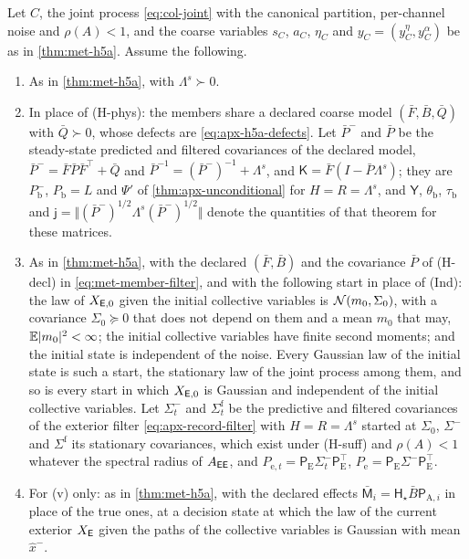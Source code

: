 \begin{theorem}\label{thm:apx-h5a}
Let $C$, the joint process \eqref{eq:col-joint} with the canonical partition, per-channel noise and $\rho(A)<1$, and the coarse variables $s_C$, $a_C$, $\eta_C$ and $y_C=(y^\eta_C,y^\alpha_C)$ be as in \cref{thm:met-h5a}. Assume the following.
\begin{enumerate}
\item[(H-suff)] As in \cref{thm:met-h5a}, with $\Lambda^s\succ0$.
\item[(H-decl)] In place of (H-phys): the members share a declared coarse model $(\bar F,\bar B,\bar Q)$ with $\bar Q\succ0$, whose defects are \eqref{eq:apx-h5a-defects}. Let $\bar P^-$ and $\bar P$ be the steady-state predicted and filtered covariances of the declared model, $\bar P^-=\bar F\bar P\bar F^\top+\bar Q$ and $\bar P^{-1}=(\bar P^-)^{-1}+\Lambda^s$, and $\mathsf K=\bar F(I-\bar P\Lambda^s)$; they are $P^-_{\mathrm b}$, $P_{\mathrm b}=L$ and $\Psi'$ of \cref{thm:apx-unconditional} for $H=R=\Lambda^s$, and $\mathsf Y$, $\theta_{\mathrm b}$, $\tau_{\mathrm b}$ and $\mathsf j=\Vert(\bar P^-)^{1/2}\Lambda^s(\bar P^-)^{1/2}\Vert$ denote the quantities of that theorem for these matrices.
\item[(H-prot)] As in \cref{thm:met-h5a}, with the declared $(\bar F,\bar B)$ and the covariance $\bar P$ of (H-decl) in \eqref{eq:met-member-filter}, and with the following start in place of (Ind): the law of $X_{\mathsf{E},0}$ given the initial collective variables is $\mathcal{N}(m_0,\Sigma_0)$, with a covariance $\Sigma_0\succeq0$ that does not depend on them and a mean $m_0$ that may, $\mathbb{E}\lvert m_0\rvert^2<\infty$; the initial collective variables have finite second moments; and the initial state is independent of the noise. Every Gaussian law of the initial state is such a start, the stationary law of the joint process among them, and so is every start in which $X_{\mathsf{E},0}$ is Gaussian and independent of the initial collective variables. Let $\Sigma^-_t$ and $\Sigma^{\mathrm f}_t$ be the predictive and filtered covariances of the exterior filter \eqref{eq:apx-record-filter} with $H=R=\Lambda^s$ started at $\Sigma_0$, $\Sigma^-$ and $\Sigma^{\mathrm f}$ its stationary covariances, which exist under (H-suff) and $\rho(A)<1$ whatever the spectral radius of $A_{\mathsf{E}\mathsf{E}}$, and $P_{\mathrm e,t}=\mathsf P_{\mathrm E}\Sigma^-_t\mathsf P_{\mathrm E}^\top$, $P_{\mathrm e}=\mathsf P_{\mathrm E}\Sigma^-\mathsf P_{\mathrm E}^\top$.
\item[(H-act)] For (v) only: as in \cref{thm:met-h5a}, with the declared effects $\bar{\mathsf M}_i=\mathsf H_\star\bar B\mathsf P_{\mathrm A,i}$ in place of the true ones, at a decision state at which the law of the current exterior $X_{\mathsf{E}}$ given the paths of the collective variables is Gaussian with mean $\hat x^-$.

\end{enumerate}
\end{theorem}
